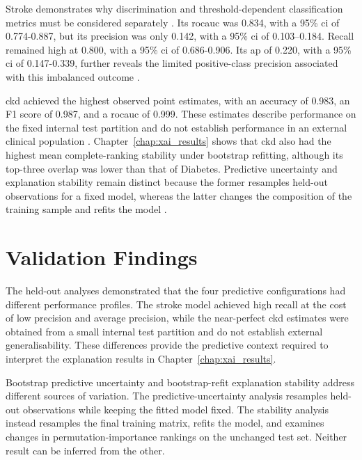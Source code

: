 Stroke demonstrates why discrimination and threshold-dependent classification metrics must be considered separately \citep{fawcett_introduction_2006, powers_evaluation_2011}. Its \gls{rocauc} was 0.834, with a 95\% \gls{ci} of 0.774-0.887, but its precision was only 0.142, with a 95\% \gls{ci} of 0.103--0.184. Recall remained high at 0.800, with a 95\% \gls{ci} of 0.686-0.906. Its \gls{ap} of 0.220, with a 95\% \gls{ci} of 0.147-0.339, further reveals the limited positive-class precision associated with this imbalanced outcome \citep{saito_precision-recall_2015}.

\gls{ckd} achieved the highest observed point estimates, with an accuracy of 0.983, an F1 score of 0.987, and a \gls{rocauc} of 0.999. These estimates describe performance on the fixed internal test partition and do not establish performance in an external clinical population \citep{collins_tripodai_2024, moons_probastai_2025}. Chapter~\ref{chap:xai_results} shows that \gls{ckd} also had the highest mean complete-ranking stability under bootstrap refitting, although its top-three overlap was lower than that of Diabetes. Predictive uncertainty and explanation stability remain distinct because the former resamples held-out observations for a fixed model, whereas the latter changes the composition of the training sample and refits the model \citep{lofstrom_meta_2022, canha_functionally-grounded_2025}.

\section{Validation Findings}

The held-out analyses demonstrated that the four predictive configurations had different performance profiles. The stroke model achieved high recall at the cost of low precision and average precision, while the near-perfect \gls{ckd} estimates were obtained from a small internal test partition and do not establish external generalisability. These differences provide the predictive context required to interpret the explanation results in Chapter~\ref{chap:xai_results}.

Bootstrap predictive uncertainty and bootstrap-refit explanation stability address different sources of variation. The predictive-uncertainty analysis resamples held-out observations while keeping the fitted model fixed. The stability analysis instead resamples the final training matrix, refits the model, and examines changes in permutation-importance rankings on the unchanged test set. Neither result can be inferred from the other.
